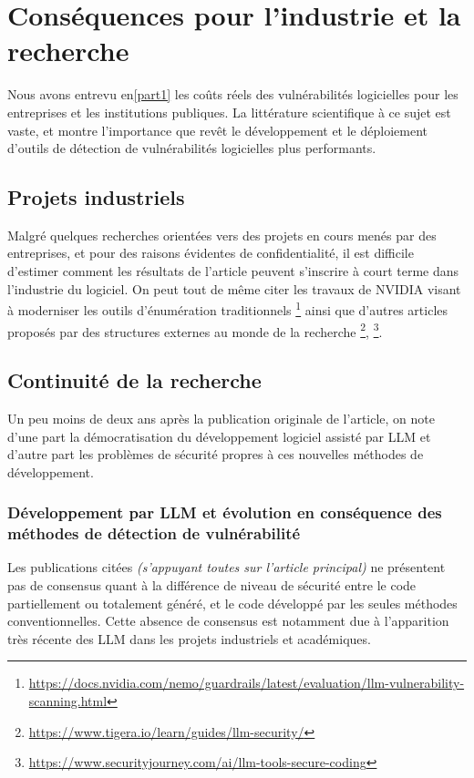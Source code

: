 \chapter{Conséquences pour l'industrie et la recherche}
    Nous avons entrevu en\ref{part1} les coûts réels des vulnérabilités logicielles
    pour les entreprises et les institutions publiques. La littérature scientifique à ce sujet
    est vaste\cite{vuln_cost},\cite{vuln_cost2} et montre l'importance que revêt le
    développement et le déploiement d'outils de détection de vulnérabilités logicielles plus
    performants.
    \section{Projets industriels}
        Malgré quelques recherches orientées vers des projets en cours menés par des
        entreprises, et pour des raisons évidentes de confidentialité, il est difficile
        d'estimer comment les résultats de l'article peuvent s'inscrire à court terme dans
        l'industrie du logiciel. On peut tout de même citer les travaux de NVIDIA visant à
        moderniser les outils d'énumération traditionnels
\footnote{
    \url{https://docs.nvidia.com/nemo/guardrails/latest/evaluation/llm-vulnerability-scanning.html}} ainsi que d'autres articles proposés
        par des structures externes au monde de la recherche \footnote{\url{https://www.tigera.io/learn/guides/llm-security/}},
        \footnote{\url{https://www.securityjourney.com/ai/llm-tools-secure-coding}}.
    \section{Continuité de la recherche}

        Un peu moins de deux ans après la publication originale de l'article, on note d'une part
        la démocratisation du développement logiciel assisté par LLM \cite{citing5} et d'autre
        part les problèmes de sécurité propres à ces nouvelles méthodes de développement\cite{citing1, citing2, citing3, citing4}.
        \subsection{Développement par LLM et évolution en conséquence des méthodes de détection de vulnérabilité}
            Les publications citées \textit{(s'appuyant toutes sur l'article principal)} ne
            présentent pas de consensus quant à la différence de niveau de sécurité entre le code
            partiellement ou totalement généré, et le code développé par les seules méthodes
            conventionnelles. Cette absence de consensus est notamment due à l'apparition très
            récente des LLM dans les projets industriels et académiques.


